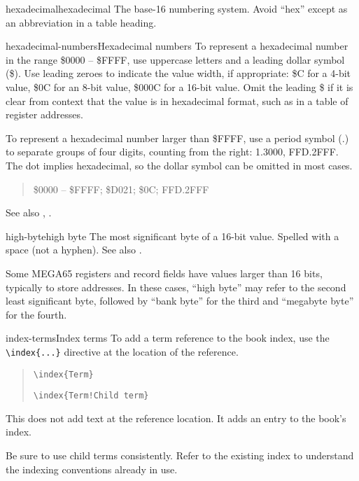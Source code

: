 \begin{sgentry}{hexadecimal}{hexadecimal}
    The base-16 numbering system. Avoid ``hex'' except as an abbreviation in a table heading.
\end{sgentry}

\begin{sgentry}{hexadecimal-numbers}{Hexadecimal numbers}
    To represent a hexadecimal number in the range \$0000 -- \$FFFF, use uppercase letters and a leading dollar symbol (\$). Use leading zeroes to indicate the value width, if appropriate: \$C for a 4-bit value, \$0C for an 8-bit value, \$000C for a 16-bit value. Omit the leading \$ if it is clear from context that the value is in hexadecimal format, such as in a table of register addresses.

    To represent a hexadecimal number larger than \$FFFF, use a period symbol (.) to separate groups of four digits, counting from the right: 1.3000, FFD.2FFF. The dot implies hexadecimal, so the dollar symbol can be omitted in most cases.

    \begin{quote}
        \$0000 -- \$FFFF; \$D021; \$0C; FFD.2FFF
    \end{quote}

    See also , .
\end{sgentry}

\begin{sgentry}{high-byte}{high byte}
    The most significant byte of a 16-bit value. Spelled with a space (not a hyphen). See also .

    Some MEGA65 registers and record fields have values larger than 16 bits, typically to store addresses. In these cases, ``high byte'' may refer to the second least significant byte, followed by ``bank byte'' for the third and ``megabyte byte'' for the fourth.
\end{sgentry}

\begin{sgentry}{index-terms}{Index terms}
    To add a term reference to the book index, use the \texttt{{\textbackslash}index\{...\}} directive at the location of the reference.

    \begin{quote}
        \texttt{{\textbackslash}index\{Term\}}

        \hrulefill

        \texttt{{\textbackslash}index\{Term!Child term\}}
    \end{quote}

    This does not add text at the reference location. It adds an entry to the book's index.

    Be sure to use child terms consistently. Refer to the existing index to understand the indexing conventions already in use.
\end{sgentry}

